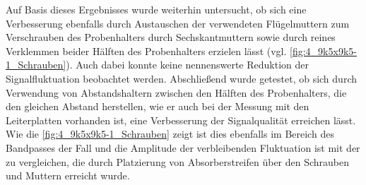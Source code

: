 Auf Basis dieses Ergebnisses wurde weiterhin untersucht, ob sich eine Verbesserung ebenfalls durch Austauschen der verwendeten Flügelmuttern zum Verschrauben des Probenhalters durch Sechskantmuttern sowie durch reines Verklemmen beider Hälften des Probenhalters erzielen lässt (vgl. \Abb\ref{fig:4_9k5x9k5-1_Schrauben}). Auch dabei konnte keine nennenswerte Reduktion der Signalfluktuation beobachtet werden. Abschließend wurde getestet, ob sich durch Verwendung von Abstandshaltern zwischen den Hälften des Probenhalters, die den gleichen Abstand herstellen, wie er auch bei der Messung mit den Leiterplatten vorhanden ist, eine Verbesserung der Signalqualität erreichen lässt. Wie die \Abb\ref{fig:4_9k5x9k5-1_Schrauben} zeigt ist dies ebenfalls im Bereich des Bandpasses der Fall und die Amplitude der verbleibenden Fluktuation ist mit der zu vergleichen, die durch Platzierung von Absorberstreifen über den Schrauben und Muttern erreicht wurde. 
\par
\vspace{\linespace}

